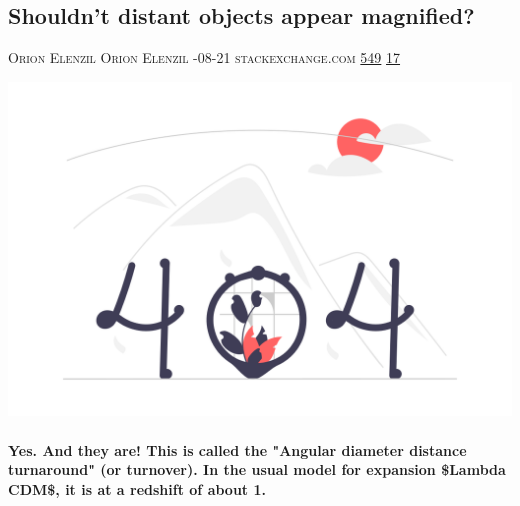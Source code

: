 \documentclass[10pt,a4paper]{article}
\begin{document}
\begin{multicols*}{2}

\noindent\begin{minipage}{\linewidth}
\subsection{Shouldn't distant objects appear magnified?}
\textsc{\footnotesize
{\scriptsize\faUser}\space 
Orion Elenzil Orion Elenzil 
{\scriptsize\faCalendar}-08-21 
{\scriptsize\faGlobe}\space 
stackexchange.com 
{\scriptsize\faThumbsOUp}\space 
\href{http://news.ycombinator.com/item?id=37198954\&utm\_term=comment}{549} 
{\scriptsize\faComments}\space 
\href{http://news.ycombinator.com/item?id=37198954\&utm\_term=comment}{17} 
}
\par\medskip\noindent
\href{https://astronomy.stackexchange.com/questions/54499/shouldnt-very-very-distant-objects-appear-magnified?utm\_source=hackernewsletter\&utm\_medium=email\&utm\_term=learn}{
    \includegraphics[width=0.99\linewidth]{notfound.png}
}
\end{minipage}
\paragraph{}
\textbf{Yes. And they are! This is called the "Angular diameter distance turnaround" (or turnover). In the usual model for expansion \$Lambda CDM\$, it is at a redshift of about 1.}

\end{multicols*}
\end{document}
